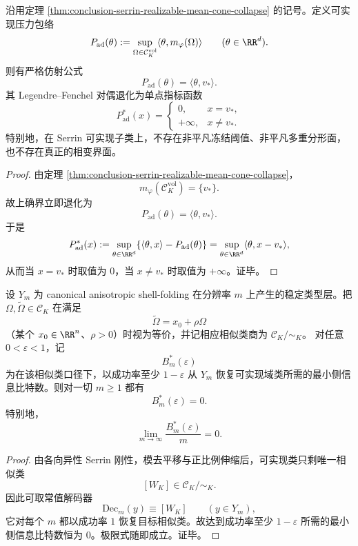 \begin{corollary}[可实现热力学前沿的仿射化]\label{cor:conclusion-serrin-realizable-thermodynamic-frontier-affine}
沿用定理 \ref{thm:conclusion-serrin-realizable-mean-cone-collapse} 的记号。定义可实现压力包络
\[
P_{\mathrm{ad}}(\theta):=\sup_{\Omega\in\mathcal C_K^{\mathrm{vol}}}\langle \theta,m_\varphi(\Omega)\rangle
\qquad
(\theta\in\RR^d).
\]
则有严格仿射公式
\[
P_{\mathrm{ad}}(\theta)=\langle \theta,v_\ast\rangle.
\]
其 Legendre--Fenchel 对偶退化为单点指标函数
\[
P_{\mathrm{ad}}^\ast(x)=
\begin{cases}
0, & x=v_\ast,\\
+\infty, & x\neq v_\ast.
\end{cases}
\]
特别地，在 Serrin 可实现子类上，不存在非平凡冻结阈值、非平凡多重分形面，也不存在真正的相变界面。
\end{corollary}
\begin{proof}
由定理 \ref{thm:conclusion-serrin-realizable-mean-cone-collapse}，
\[
m_\varphi(\mathcal C_K^{\mathrm{vol}})=\{v_\ast\}.
\]
故上确界立即退化为
\[
P_{\mathrm{ad}}(\theta)=\langle \theta,v_\ast\rangle.
\]
于是
\[
P_{\mathrm{ad}}^\ast(x)
:=
\sup_{\theta\in\RR^d}\{\langle \theta,x\rangle-P_{\mathrm{ad}}(\theta)\}
=
\sup_{\theta\in\RR^d}\langle \theta,x-v_\ast\rangle,
\]
从而当 \(x=v_\ast\) 时取值为 \(0\)，当 \(x\neq v_\ast\) 时取值为 \(+\infty\)。证毕。
\end{proof}

\begin{theorem}[过定椭圆刚性把正速率可逆需求压缩为零]\label{thm:conclusion-serrin-rigidity-zero-sideinfo-rate}
设 \(Y_m\) 为 canonical anisotropic shell-folding 在分辨率 \(m\) 上产生的稳定类型层。把 \(\Omega,\widetilde\Omega\in\mathcal C_K\) 在满足
\[
\widetilde\Omega=x_0+\rho\Omega
\]
（某个 \(x_0\in\RR^n\)、\(\rho>0\)）时视为等价，并记相应相似类商为 \(\mathcal C_K/\!\sim_K\)。
对任意 \(0<\varepsilon<1\)，记
\[
B_m^\ast(\varepsilon)
\]
为在该相似类口径下，以成功率至少 \(1-\varepsilon\) 从 \(Y_m\) 恢复可实现域类所需的最小侧信息比特数。则对一切 \(m\ge 1\) 都有
\[
B_m^\ast(\varepsilon)=0.
\]
特别地，
\[
\lim_{m\to\infty}\frac{B_m^\ast(\varepsilon)}{m}=0.
\]
\end{theorem}
\begin{proof}
由各向异性 Serrin 刚性，模去平移与正比例伸缩后，可实现类只剩唯一相似类
\[
[W_K]\in \mathcal C_K/\!\sim_K.
\]
因此可取常值解码器
\[
\mathrm{Dec}_m(y)\equiv [W_K]
\qquad
(y\in Y_m),
\]
它对每个 \(m\) 都以成功率 \(1\) 恢复目标相似类。故达到成功率至少 \(1-\varepsilon\) 所需的最小侧信息比特数恒为 \(0\)。极限式随即成立。证毕。
\end{proof}

